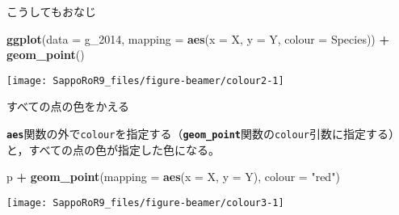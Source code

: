 \documentclass[ignorenonframetext,]{beamer}
\newenvironment{Shaded}{\begin{snugshade}}{\end{snugshade}}
\newcommand{\KeywordTok}[1]{\textcolor[rgb]{0.13,0.29,0.53}{\textbf{#1}}}
\newcommand{\DataTypeTok}[1]{\textcolor[rgb]{0.13,0.29,0.53}{#1}}
\newcommand{\DecValTok}[1]{\textcolor[rgb]{0.00,0.00,0.81}{#1}}
\newcommand{\StringTok}[1]{\textcolor[rgb]{0.31,0.60,0.02}{#1}}
\newcommand{\OperatorTok}[1]{\textcolor[rgb]{0.81,0.36,0.00}{\textbf{#1}}}
\newcommand{\NormalTok}[1]{#1}
\let\oldShaded\Shaded
\let\endoldShaded\endShaded
\renewenvironment{Shaded}{\footnotesize\oldShaded}{\endoldShaded}
\begin{document}
\begin{frame}[fragile]{こうしてもおなじ}

\begin{Shaded}
\begin{Highlighting}[]
\KeywordTok{ggplot}\NormalTok{(}\DataTypeTok{data =}\NormalTok{ g_}\DecValTok{2014}\NormalTok{,}
       \DataTypeTok{mapping =} \KeywordTok{aes}\NormalTok{(}\DataTypeTok{x =}\NormalTok{ X, }\DataTypeTok{y =}\NormalTok{ Y, }\DataTypeTok{colour =}\NormalTok{ Species)) }\OperatorTok{+}
\StringTok{  }\KeywordTok{geom_point}\NormalTok{()}
\end{Highlighting}
\end{Shaded}

\texttt{[image: SappoRoR9\_files/figure-beamer/colour2-1]}

\end{frame}

\begin{frame}[fragile]{すべての点の色をかえる}

\textbf{\texttt{aes}}関数の外で\texttt{colour}を指定する（\textbf{\texttt{geom\_point}}関数の\texttt{colour}引数に指定する）と，すべての点の色が指定した色になる。

\begin{Shaded}
\begin{Highlighting}[]
\NormalTok{p }\OperatorTok{+}\StringTok{ }\KeywordTok{geom_point}\NormalTok{(}\DataTypeTok{mapping =} \KeywordTok{aes}\NormalTok{(}\DataTypeTok{x =}\NormalTok{ X, }\DataTypeTok{y =}\NormalTok{ Y), }\DataTypeTok{colour =} \StringTok{"red"}\NormalTok{)}
\end{Highlighting}
\end{Shaded}

\texttt{[image: SappoRoR9\_files/figure-beamer/colour3-1]}

\end{frame}
\end{document}
